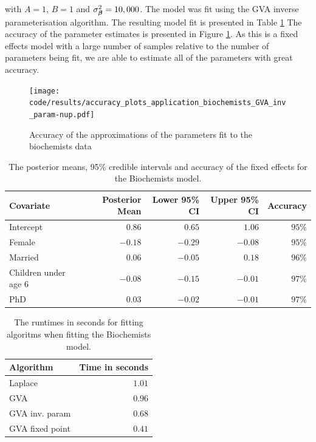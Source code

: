 \noindent with $A=1$, $B=1$ and $\sigma_{\boldsymbol \beta}^2 = 10,000$. The model was fit using the GVA inverse parameterisation algorithm. The resulting model fit is presented in Table \ref{tab:biochemists_results}
The accuracy of the parameter estimates is presented in Figure
\ref{fig:biochemists}. As this is a fixed effects model with a large number of samples relative to the
number of parameters being fit, we are able to estimate all of the parameters with great accuracy.

\begin{figure}[h]
\texttt{[image: code/results/accuracy\_plots\_application\_biochemists\_GVA\_inv\_param-nup.pdf]}
\label{fig:biochemists}
\caption{Accuracy of the approximations of the parameters fit to the biochemists data}
\end{figure}

\begin{table}
	\begin{tabular}{|l|rrrr|}
		\hline
		Covariate          & Posterior Mean & Lower 95\% CI & Upper 95\% CI & Accuracy \\
		\hline
		Intercept & $0.86$ & $0.65$ & $1.06$ &  $95\%$ \\
		Female & $-0.18$ & $-0.29$ & $-0.08$ &  $95\%$ \\
		Married & $0.06$ & $-0.05$ & $0.18$ & $96\%$ \\
		Children under age 6 & $-0.08$ & $-0.15$ & $-0.01$ & $97\%$ \\
		PhD & $0.03$ & $-0.02$ & $-0.01$ & $97\%$ \\
		\hline
	\end{tabular}			
	\label{tab:biochemists_results}
	\caption{The posterior means, 95\% credible intervals and accuracy of the fixed effects for the 
						Biochemists model.}
\end{table}

\begin{table}
	\begin{tabular}{|l|r|}
	\hline
	Algorithm & Time in seconds \\
	\hline
	Laplace & $1.01$ \\
	GVA & $0.96$ \\
	GVA inv. param & $0.68$ \\
	GVA fixed point & $0.41$ \\
	\hline
	\end{tabular}
	\label{tab:biochemists_runtime}
	\caption{The runtimes in seconds for fitting algoritms when fitting the Biochemists model.}
\end{table}

